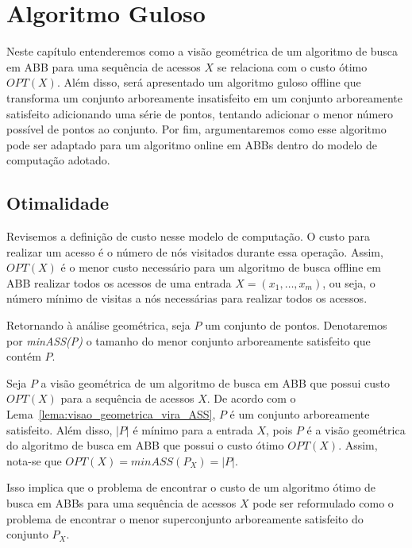 
\chapter{Algoritmo Guloso}
\label{cap:algoritmo-guloso}


Neste capítulo entenderemos como a visão geométrica de um algoritmo de busca em ABB para uma sequência de acessos $X$ se relaciona com o custo ótimo $OPT(X)$. Além disso, será apresentado um algoritmo guloso offline que transforma um conjunto arboreamente insatisfeito em um conjunto arboreamente satisfeito adicionando uma série de pontos, tentando adicionar o menor número possível de pontos ao conjunto. Por fim, argumentaremos como esse algoritmo pode ser adaptado para um algoritmo online em ABBs dentro do modelo de computação adotado.

\section{Otimalidade} 

Revisemos a definição de custo nesse modelo de computação. O custo para realizar um acesso é o número de nós visitados durante essa operação. Assim, $OPT(X)$ é o menor custo necessário para um algoritmo de busca offline em ABB realizar todos os acessos de uma entrada $X = (x_{1},\ldots,x_{m})$, ou seja, o número mínimo de visitas a nós necessárias para realizar todos os acessos.

Retornando à análise geométrica, seja $P$ um conjunto de pontos. Denotaremos por \textit{minASS(P)} o tamanho do menor conjunto arboreamente satisfeito que contém $P$. 

Seja $P$ a visão geométrica de um algoritmo de busca em ABB que possui custo $OPT(X)$ para a sequência de acessos $X$. De acordo com o Lema~\ref{lema:visao_geometrica_vira_ASS}, $P$ é um conjunto arboreamente satisfeito. Além disso, $|P|$ é mínimo para a entrada $X$, pois $P$ é a visão geométrica do algoritmo de busca em ABB que possui o custo ótimo $OPT(X)$. Assim, nota-se que $OPT(X) = minASS(P_X) = |P|$.

Isso implica que o problema de encontrar o custo de um algoritmo ótimo de busca em ABBs para uma sequência de acessos $X$ pode ser reformulado como o problema de encontrar o menor superconjunto arboreamente satisfeito do conjunto $P_X$.

